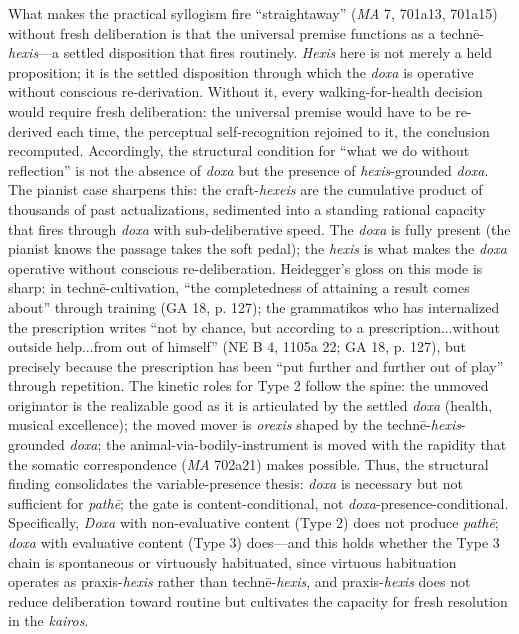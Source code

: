 \documentclass{article}
\begin{document}
What makes the practical syllogism fire ``straightaway'' (\textit{MA} 7, 701a13, 701a15) without fresh deliberation is that the universal premise functions as a technē-\textit{hexis}---a settled disposition that fires routinely. \textit{Hexis} here is not merely a held proposition; it is the settled disposition through which the \textit{doxa} is operative without conscious re-derivation. Without it, every walking-for-health decision would require fresh deliberation: the universal premise would have to be re-derived each time, the perceptual self-recognition rejoined to it, the conclusion recomputed. Accordingly, the structural condition for ``what we do without reflection'' is not the absence of \textit{doxa} but the presence of \textit{hexis}-grounded \textit{doxa}. The pianist case sharpens this: the craft-\textit{hexeis} are the cumulative product of thousands of past actualizations, sedimented into a standing rational capacity that fires through \textit{doxa} with sub-deliberative speed. The \textit{doxa} is fully present (the pianist knows the passage takes the soft pedal); the \textit{hexis} is what makes the \textit{doxa} operative without conscious re-deliberation. Heidegger's gloss on this mode is sharp: in technē-cultivation, ``the completedness of attaining a result comes about'' through training (GA 18, p. 127); the grammatikos who has internalized the prescription writes ``not by chance, but according to a prescription...without outside help...from out of himself'' (NE B 4, 1105a 22; GA 18, p. 127), but precisely because the prescription has been ``put further and further out of play'' through repetition. The kinetic roles for Type 2 follow the spine: the unmoved originator is the realizable good as it is articulated by the settled \textit{doxa} (health, musical excellence); the moved mover is \textit{orexis} shaped by the technē-\textit{hexis}-grounded \textit{doxa}; the animal-via-bodily-instrument is moved with the rapidity that the somatic correspondence (\textit{MA} 702a21) makes possible. Thus, the structural finding consolidates the variable-presence thesis: \textit{doxa} is necessary but not sufficient for \textit{pathē}; the gate is content-conditional, not \textit{doxa}-presence-conditional. Specifically, \textit{Doxa} with non-evaluative content (Type 2) does not produce \textit{pathē}; \textit{doxa} with evaluative content (Type 3) does---and this holds whether the Type 3 chain is spontaneous or virtuously habituated, since virtuous habituation operates as praxis-\textit{hexis} rather than technē-\textit{hexis}, and praxis-\textit{hexis} does not reduce deliberation toward routine but cultivates the capacity for fresh resolution in the \textit{kairos}.
\end{document}

